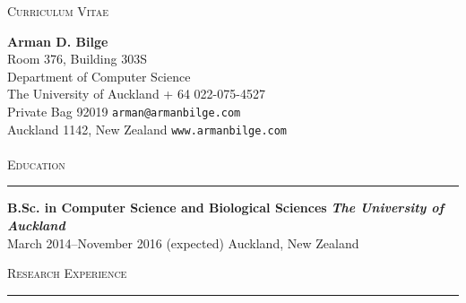 \documentclass[11pt,letterpaper]{article}
\begin{document}
\thispagestyle{empty}

\null

\centering
\Large \textsc{Curriculum Vitae}

\vspace{0.5\baselineskip}

\begin{flushleft}

\LARGE \textbf{Arman D. Bilge} \hfill \normalsize \\
Room 376, Building 303S \\
Department of Computer Science \\
The University of Auckland \hfill + 64 022-075-4527 \\
Private Bag 92019 \hfill \texttt{arman@armanbilge.com} \\
Auckland 1142, New Zealand \hfill \texttt{www.armanbilge.com} \\

\hfill \\

%

\LARGE \textsc{Education} \\ \vspace{11pt} \hrule \normalsize \vspace{0.5\baselineskip}

\begin{adjustwidth}{1em}{1em}
\textbf{B.Sc. in Computer Science and Biological Sciences} \hfill \textbf{\emph{The University of Auckland}} \\
March 2014--November 2016 (expected) \hfill Auckland, New Zealand
\end{adjustwidth}

\LARGE \textsc{Research Experience} \\ \vspace{11pt} \hrule \normalsize \vspace{0.5\baselineskip}


\end{flushleft}
\end{document}
